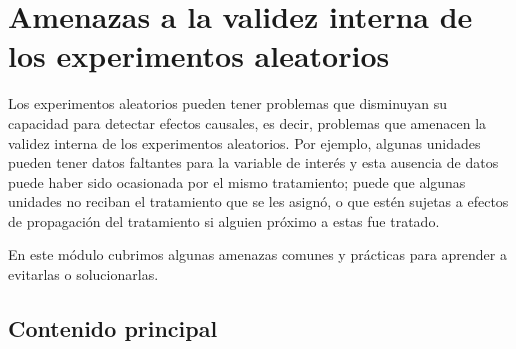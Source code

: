 \documentclass[
  12pt,
  spanish,
]{book}
\begin{document}
\hypertarget{amenazas-a-la-validez-interna-de-los-experimentos-aleatorios}{%
\chapter{Amenazas a la validez interna de los experimentos aleatorios}\label{amenazas-a-la-validez-interna-de-los-experimentos-aleatorios}}

Los experimentos aleatorios pueden tener problemas que disminuyan su capacidad para detectar efectos causales, es decir, problemas que amenacen la validez interna de los experimentos aleatorios. Por ejemplo, algunas unidades pueden tener datos faltantes para la variable de interés y esta ausencia de datos puede haber sido ocasionada por el mismo tratamiento; puede que algunas unidades no reciban el tratamiento que se les asignó, o que estén sujetas a efectos de propagación del tratamiento si alguien próximo a estas fue tratado.

En este módulo cubrimos algunas amenazas comunes y prácticas para aprender a evitarlas o solucionarlas.

\hypertarget{contenido-principal-7}{%
\section{Contenido principal}\label{contenido-principal-7}}
\end{document}
